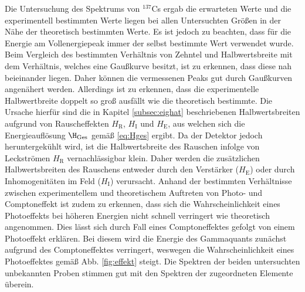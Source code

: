 Die Untersuchung des Spektrums von $^{137}$Cs ergab die erwarteten Werte und die experimentell bestimmten Werte liegen bei allen Untersuchten Größen in der Nähe der theoretisch bestimmten Werte. Es ist jedoch zu beachten, dass für die Energie am Vollenergiepeak immer der selbst bestimmte Wert verwendet wurde. Beim Vergleich des bestimmten Verhältnis von Zehntel und Halbwertsbreite mit dem Verhältnis, welches eine Gaußkurve besitzt, ist zu erkennen, dass diese nah beieinander liegen. Daher können die vermessenen Peaks gut durch Gaußkurven angenähert werden. Allerdings ist zu erkennen, dass die experimentelle Halbwertbreite doppelt so groß ausfällt wie die theoretisch bestimmte. Die Ursache hierfür sind die in Kapitel \ref{subsec:eighat} beschriebenen Halbwertsbreiten aufgrund von Rauscheffekten $H_\text{R}$, $H_\text{I}$ und $H_\text{E}$, aus welchen sich die Energieauflösung $\H_\text{Ges}$ gemäß \eqref{eq:Hges} ergibt. Da der Detektor jedoch heruntergekühlt wird, ist die Halbwertsbreite des Rauschen infolge von Leckströmen $H_\text{R}$ vernachlässigbar klein. Daher werden die zusätzlichen Halbwertsbreiten des Rauschens entweder durch den Verstärker ($H_\text{E}$) oder durch Inhomogenitäten im Feld ($H_\text{I}$) verursacht. Anhand der bestimmten Verhältnisse zwischen experimentellem und theoretischem Auftreten von Photo- und Comptoneffekt ist zudem zu erkennen, dass sich die Wahrscheinlichkeit eines Photoeffekts bei höheren Energien nicht schnell verringert wie theoretisch angenommen. Dies lässt sich durch Fall eines Comptoneffektes gefolgt von einem Photoeffekt erklären. Bei diesem wird die Energie des Gammaquants zunächst aufgrund des Comptoneffektes verringert, weswegen die Wahrscheinlichkeit eines Photoeffektes gemäß Abb. \ref{fig:effekt} steigt.
Die Spektren der beiden untersuchten unbekannten Proben stimmen gut mit den Spektren der zugeordneten Elemente überein.